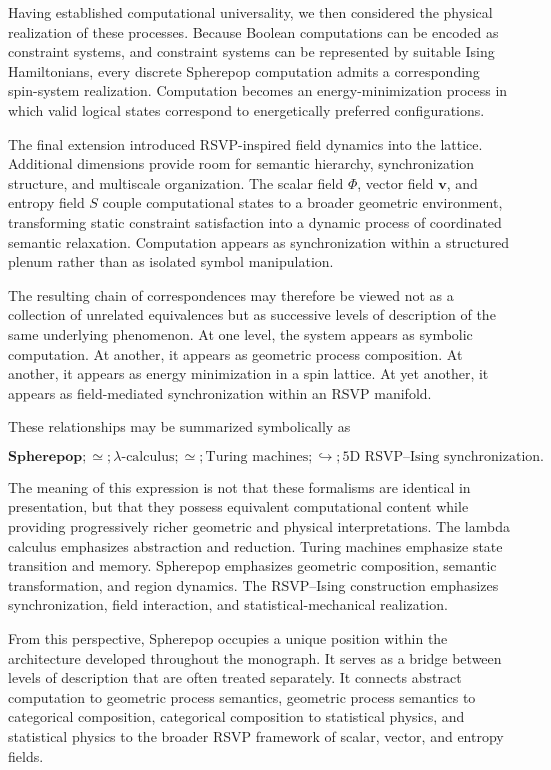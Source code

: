 \documentclass[12pt,letterpaper]{article}
\theoremstyle{remark}
\begin{document}
Having established computational universality, we then considered the physical realization of these processes. Because Boolean computations can be encoded as constraint systems, and constraint systems can be represented by suitable Ising Hamiltonians, every discrete Spherepop computation admits a corresponding spin-system realization. Computation becomes an energy-minimization process in which valid logical states correspond to energetically preferred configurations.

The final extension introduced RSVP-inspired field dynamics into the lattice. Additional dimensions provide room for semantic hierarchy, synchronization structure, and multiscale organization. The scalar field $\Phi$, vector field $\mathbf{v}$, and entropy field $S$ couple computational states to a broader geometric environment, transforming static constraint satisfaction into a dynamic process of coordinated semantic relaxation. Computation appears as synchronization within a structured plenum rather than as isolated symbol manipulation.

The resulting chain of correspondences may therefore be viewed not as a collection of unrelated equivalences but as successive levels of description of the same underlying phenomenon. At one level, the system appears as symbolic computation. At another, it appears as geometric process composition. At another, it appears as energy minimization in a spin lattice. At yet another, it appears as field-mediated synchronization within an RSVP manifold.

These relationships may be summarized symbolically as

\[
\boxed{
\textbf{Spherepop}
;\simeq;
\lambda\text{-calculus}
;\simeq;
\text{Turing machines}
;\hookrightarrow;
\text{5D RSVP--Ising synchronization}.
}
\]

The meaning of this expression is not that these formalisms are identical in presentation, but that they possess equivalent computational content while providing progressively richer geometric and physical interpretations. The lambda calculus emphasizes abstraction and reduction. Turing machines emphasize state transition and memory. Spherepop emphasizes geometric composition, semantic transformation, and region dynamics. The RSVP--Ising construction emphasizes synchronization, field interaction, and statistical-mechanical realization.

From this perspective, Spherepop occupies a unique position within the architecture developed throughout the monograph. It serves as a bridge between levels of description that are often treated separately. It connects abstract computation to geometric process semantics, geometric process semantics to categorical composition, categorical composition to statistical physics, and statistical physics to the broader RSVP framework of scalar, vector, and entropy fields.
\end{document}
